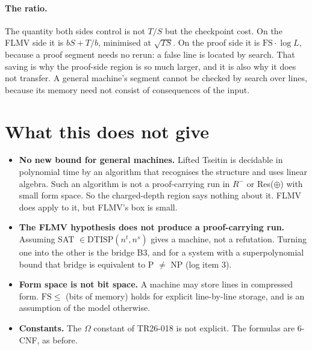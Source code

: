 \documentclass[11pt]{article}
\begin{document}
\paragraph{The ratio.} The quantity both sides control is not $T/S$ but the checkpoint cost. On the FLMV side it is $bS+T/b$, minimised at $\sqrt{TS}$. On the proof side it is $\mathrm{FS}\cdot\log L$, because a proof segment needs no rerun: a false line is located by search. That saving is why the proof-side region is so much larger, and it is also why it does not transfer. A general machine's segment cannot be checked by search over lines, because its memory need not consist of consequences of the input.

\section{What this does not give}
\begin{itemize}
\item \textbf{No new bound for general machines.} Lifted Tseitin is decidable in polynomial time by an algorithm that recognises the structure and uses linear algebra. Such an algorithm is not a proof-carrying run in $R^-$ or Res($\oplus$) with small form space. So the charged-depth region says nothing about it. FLMV does apply to it, but FLMV's box is small.
\item \textbf{The FLMV hypothesis does not produce a proof-carrying run.} Assuming SAT $\in\mathrm{DTISP}(n^t,n^s)$ gives a machine, not a refutation. Turning one into the other is the bridge B3, and for a system with a superpolynomial bound that bridge is equivalent to P $\ne$ NP (log item 3).
\item \textbf{Form space is not bit space.} A machine may store lines in compressed form. $\mathrm{FS}\le$ (bits of memory) holds for explicit line-by-line storage, and is an assumption of the model otherwise.
\item \textbf{Constants.} The $\Omega$ constant of TR26-018 is not explicit. The formulas are 6-CNF, as before.
\end{itemize}
\end{document}
